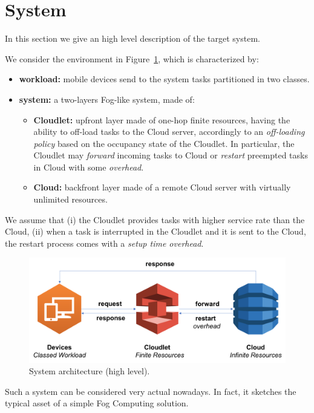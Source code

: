 \section{System}
\label{sec:system}

In this section we give an high level description of the target system.

We consider the environment in Figure~\ref{fig:system-architecture}, which is characterized by:

\begin{itemize}
	\item  \textbf{workload:} mobile devices send to the system tasks partitioned in two classes.
	\item \textbf{system:} a two-layers Fog-like system, made of:	
	\begin{itemize}
		\item \textbf{Cloudlet:} upfront layer made of one-hop finite resources, having the ability to off-load tasks to the Cloud server, accordingly to an \textit{off-loading policy} based on the occupancy state of the Cloudlet. In particular, the Cloudlet may \textit{forward} incoming tasks to Cloud or \textit{restart} preempted tasks in Cloud with some \textit{overhead}.
		\item \textbf{Cloud:} backfront layer made of a remote Cloud server with virtually unlimited resources.
		
	\end{itemize}
\end{itemize}

We assume that
(i) the Cloudlet provides tasks with higher service rate than the Cloud, 
(ii) when a task is interrupted in the Cloudlet and it is sent to the Cloud, the restart process comes with a \textit{setup time overhead}.

\begin{figure}
	\includegraphics[width=\columnwidth]{fig/system-architecture}
	\caption{System architecture (high level).}
	\label{fig:system-architecture}
\end{figure}

Such a system can be considered very actual nowadays. In fact, it sketches the typical asset of a simple Fog Computing solution.